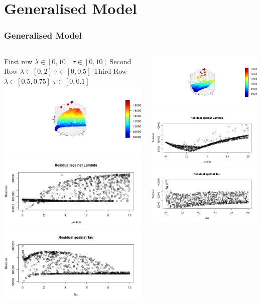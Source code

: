 \documentclass{beamer}
\begin{document}
    \section{Generalised Model}
    \begin{frame}
        \frametitle{Generalised Model}
        \begin{columns}
            First row
            $\lambda \in [0,10]$ $\tau \in [0,10]$
            Second Row
            $\lambda \in [0,2]$ $\tau\in [0,0.5]$
            Third Row
            $\lambda\in [0.5,0.75]$ $\tau\in [0,0.1]$
            \includegraphics[width=0.3\linewidth]{Parameter Estimation on Attempt _1/param_1/lam0-10tau0-10.png}
            \includegraphics[width=0.3\linewidth]{Parameter Estimation on Attempt _1/param_1/lam_1.png}
            \includegraphics[width=0.3\linewidth]{Parameter Estimation on Attempt _1/param_1/tau_1.png}
    
            \includegraphics[width=0.3\linewidth]{Parameter Estimation on Attempt _1/param_1/lam0-2tau0-0_5.png}
            \includegraphics[width=0.3\linewidth]{Parameter Estimation on Attempt _1/param_1/lam_2.png}
            \includegraphics[width=0.3\linewidth]{Parameter Estimation on Attempt _1/param_1/tau_2.png}


\end{columns}
\end{frame}
\end{document}
